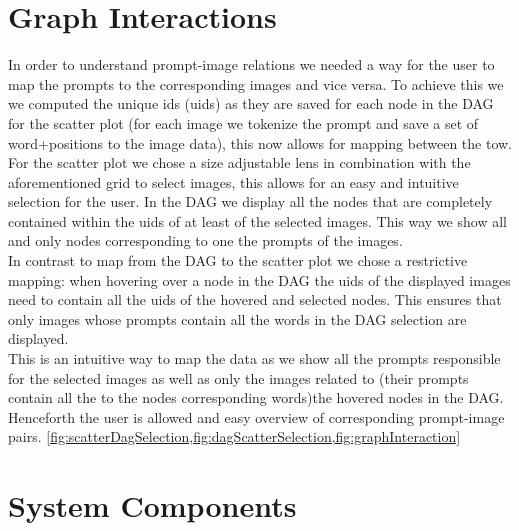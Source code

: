 \documentclass[
  a4paper,  %
  twoside,  %
  bibliography=totoc,
  headsepline,
  cleardoublepage=empty,
  parskip=half,
  draft=false
]{scrbook}
\begin{document}
\section{Graph Interactions}
In order to understand prompt-image relations we needed a way for the user to map the prompts to the corresponding images and vice versa. To achieve this we we computed the unique ids (uids) as they are saved for each node in the DAG for the scatter plot (for each image we tokenize the prompt and save a set of word+positions to the image data), this now allows for mapping between the tow.\\
For the scatter plot we chose a size adjustable lens in combination with the aforementioned grid to select images, this allows for an easy and intuitive selection for the user. In the DAG we display all the nodes that are completely contained within the uids of at least of the selected images. This way we show all and only nodes corresponding to one the prompts of the images.\\ In contrast to map from the DAG to the scatter plot we chose a restrictive mapping: when hovering over a node in the DAG the uids of the displayed images need to contain all the uids of the hovered and selected nodes. This ensures that only images whose prompts contain all the words in the DAG selection are displayed.\\ This is an intuitive way to map the data as we show all the prompts responsible for the selected images as well as only the images related to (their prompts contain all the to the nodes corresponding words)the hovered nodes in the DAG. Henceforth the user is allowed and easy overview of corresponding prompt-image pairs. \cref{fig:scatterDagSelection,fig:dagScatterSelection,fig:graphInteraction}
\section{System Components}
\end{document}
